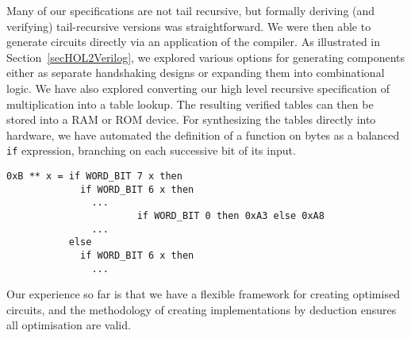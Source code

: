 Many of our specifications are not tail recursive, but formally
deriving (and verifying) tail-recursive versions was
straightforward. We were then able to generate circuits directly via
an application of the compiler.  As illustrated in
Section~\ref{secHOL2Verilog}, we explored various options for
generating components either as separate handshaking designs or expanding
them into combinational logic. We have also explored converting our
high level recursive specification of multiplication into a table
lookup. The resulting verified tables can then be stored into a RAM or
ROM device.  For synthesizing the tables directly into hardware, we
have automated the definition of a function on bytes as a balanced
\texttt{if} expression, branching on each successive bit of its input.

{\footnotesize\begin{verbatim}
0xB ** x = if WORD_BIT 7 x then
             if WORD_BIT 6 x then 
               ...
                       if WORD_BIT 0 then 0xA3 else 0xA8
               ...
           else
             if WORD_BIT 6 x then
               ...
\end{verbatim}}

Our experience so far is that we have a flexible framework for
creating optimised circuits, and the methodology of creating
implementations by deduction ensures all optimisation are valid.




